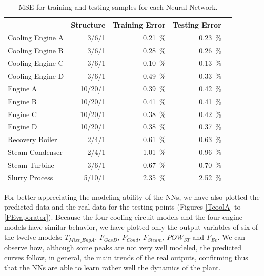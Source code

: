 \begin{table}[!t]
\caption{MSE for training and testing samples for each Neural Network.}
\label{tbl:mse}
  \centering
\begin{tabular}{lrrrr} \toprule
 & Structure  & Training Error & Testing Error \\ \midrule
Cooling Engine A & 3/6/1 & \SI{0.21}{\percent} & \SI{0.23}{\percent} \\
Cooling Engine B & 3/6/1  & \SI{0.28}{\percent} & \SI{0.26}{\percent} \\
Cooling Engine C & 3/6/1  & \SI{0.10}{\percent} & \SI{0.13}{\percent} \\
Cooling Engine D & 3/6/1  & \SI{0.49}{\percent} & \SI{0.33}{\percent} \\
 Engine A & 10/20/1  & \SI{0.39}{\percent} & \SI{0.42}{\percent} \\
 Engine B & 10/20/1  & \SI{0.41}{\percent} & \SI{0.41}{\percent} \\
 Engine C & 10/20/1  & \SI{0.38}{\percent} & \SI{0.42}{\percent} \\
 Engine D & 10/20/1  & \SI{0.38}{\percent} & \SI{0.37}{\percent} \\
 Recovery Boiler & 2/4/1  & \SI{0.61}{\percent} & \SI{0.63}{\percent} \\
 Steam Condenser & 2/4/1  & \SI{1.01}{\percent} & \SI{0.96}{\percent} \\
 Steam Turbine & 3/6/1  & \SI{0.67}{\percent} & \SI{0.70}{\percent} \\
 Slurry Process & 5/10/1  & \SI{2.35}{\percent} & \SI{2.52}{\percent} \\
 \bottomrule
\end{tabular}
\vspace{-0.3cm}

\end{table}

For better appreciating the modeling ability of the NNs, we have also plotted the predicted data and the real data for the testing points (Figures \ref{TcoolA} to \ref{PEvaporator}). Because the four cooling-circuit models and the four engine models have  similar behavior, we have plotted only the output variables of six of the twelve models: $T_{Mixt\_EngA}$, $F_{GasD}$, $P_{Cond}$, $F_{Steam}$, $POW_{ST}$ and $F_{Ev}$.  We can observe how, although some peaks are not very well modeled, the predicted curves follow, in general,  the main trends of the real outputs, confirming thus that the NNs are able to learn rather well the dynamics of the plant.


